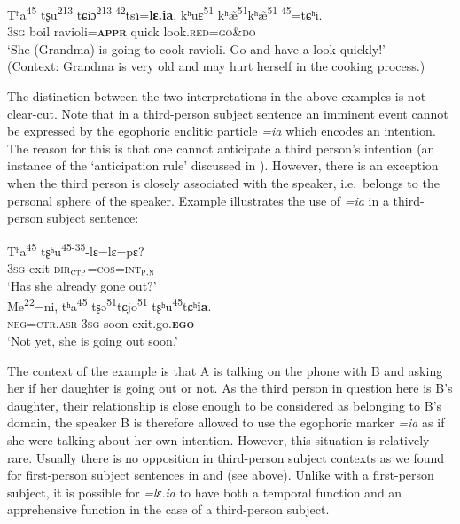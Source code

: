 \documentclass[output=paper,colorlinks,citecolor=brown, language=chinese]{langscibook}
\begin{document}
\ea\label{ex:Song38}
\gll Tʰa\textsuperscript{45} tʂu\textsuperscript{213} tɕiɔ\textsuperscript{213-42}tsɿ=\textbf{lɛ.ia}, kʰuɛ\textsuperscript{51} kʰ\~æ\textsuperscript{51}kʰ\~æ\textsuperscript{51-45}=tɕʰi. \\
\textsc{3sg} boil ravioli=\textsc{\textbf{appr}} quick look.\textsc{red=go\&do} \\
\glt `She (Grandma) is going to cook ravioli. Go and have a look quickly!' \\
(Context: Grandma is very old and may hurt herself in the cooking process.)
\z



 The distinction between the two interpretations in the above examples is not clear-cut. Note that in a third-person subject sentence an imminent event cannot be expressed by the egophoric enclitic particle \textit{=ia} which encodes an intention. The reason for this is that one cannot anticipate a third person’s intention (an instance of the `anticipation rule' discussed in \cite{TournadreLaPolla2014}). However, there is an exception when the third person is closely associated with the speaker, i.e.\  belongs to the personal sphere of the speaker. Example  illustrates the use of \textit{=ia} in a third-person subject sentence:


\begin{exe} \ex\label{ex:Song39}
\begin{xlist}  \label{ex:Song39a}
\gll Tʰa\textsuperscript{45} tʂʰu\textsuperscript{45-35}-lɛ=lɛ=pɛ? \\
\textsc{3sg} exit-\textsc{dir}$_{\textsc{ctp}}$=\textsc{cos=int}$_{\textsc{p.n}}$ \\
\glt `Has she already gone out?' \\
  \label{ex:Song39b} 
\gll  Me\textsuperscript{22}=ni, tʰa\textsuperscript{45} tʂə\textsuperscript{51}tɕjo\textsuperscript{51} tʂʰu\textsuperscript{45}tɕʰ\textbf{ia}. \\
 \textsc{neg=ctr.asr} \textsc{3sg} soon exit.go.\textsc{\textbf{ego}} \\
\glt `Not yet, she is going out soon.'
\end{xlist}
\end{exe}

\noindent The context of the example  is that A is talking on the phone with B and asking her if her daughter is going out or not. As the third person in question here is B's daughter, their relationship is close enough to be considered as belonging to B's domain, the speaker B is therefore allowed to use the egophoric marker \textit{=ia} as if she were talking about her own intention. However, this situation is relatively rare. Usually there is no opposition in third-person subject contexts as we found for first-person subject sentences in  and  (see  above). Unlike with a first-person subject, it is possible for \textit{=lɛ.ia} to have both a temporal function and an apprehensive function in the case of a third-person subject.
\end{document}
